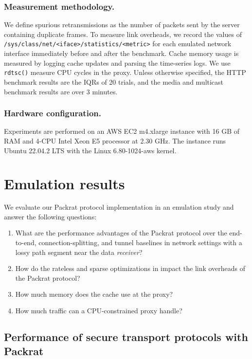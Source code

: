 \subsubsection{Measurement methodology.}

We define spurious retransmissions as the number of packets sent by the server
containing duplicate frames. To measure link overheads, we record the values
of \texttt{/sys/class/net/<iface>/statistics/<metric>} for each emulated
network interface immediately before and after the benchmark. Cache memory
usage is measured by logging cache updates and parsing the time-series logs. We
use \texttt{rdtsc()} measure CPU cycles in the proxy.
Unless otherwise specified, the HTTP benchmark results are the IQRs of
20 trials, and the media and multicast benchmark results are over 3 minutes.

\subsubsection{Hardware configuration.}

Experiments are performed on an AWS EC2 m4.xlarge instance with 16 GB of RAM
and 4-CPU Intel Xeon E5 processor at 2.30 GHz. The instance
runs Ubuntu 22.04.2 LTS with the Linux 6.80-1024-aws kernel.

\section{Emulation results}
\label{sec:packrat:emulation}

We evaluate our Packrat protocol implementation in an emulation study and answer
the following questions:
\begin{enumerate}[noitemsep]
    \item What are the performance advantages of the Packrat protocol over the
     end-to-end, connection-splitting, and tunnel baselines in network settings
     with a lossy path segment near the data \textit{receiver}?
    \item How do the rateless and sparse optimizations in
      impact the link overheads of the Packrat
     protocol?
    \item How much memory does the cache use at the proxy?
    \item How much traffic can a CPU-constrained proxy handle?
\end{enumerate}

\subsection{Performance of secure transport protocols with Packrat}
\label{sec:packrat:emulation:performance}

